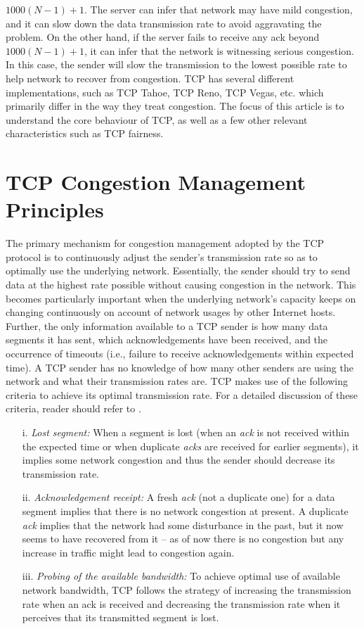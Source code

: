 \begin{multicols}{2}
$1000(N-1) + 1$. The server can infer that network may have mild congestion, and it can slow down the data transmission rate to avoid aggravating the problem. On the other hand, if the server fails to receive any ack beyond $1000(N-1) + 1$, it can infer that the network is witnessing serious congestion. In this case, the sender will slow the transmission to the lowest possible rate to help network to recover from congestion. TCP has several different implementations, such as TCP Tahoe, TCP Reno, TCP Vegas, etc. which primarily differ in the way they treat congestion. The focus of this article is to understand the core behaviour of TCP, as well as a few other relevant characteristics such as TCP fairness. 

\section*{TCP Congestion Management Principles}

The primary mechanism for congestion management adopted by the TCP protocol is to continuously adjust the sender’s transmission rate so as to optimally use the underlying network. Essentially, the sender should try to send data at the highest rate possible without causing congestion in the network. This becomes particularly important when the underlying network’s capacity keeps on changing continuously on account of network usages by other Internet hosts. Further, the only information available to a TCP sender is how many data segments it has sent, which acknowledgements have been received, and the occurrence of timeouts (i.e., failure to receive acknowledgements within expected time). A TCP sender has no knowledge of how many other senders are using the network and what their transmission rates are. TCP makes use of the following criteria to achieve its optimal transmission rate. For a detailed discussion of these criteria, reader should refer to  \cite{art2-key03}.
\begin{itemize}

\itemsep=.2cm

\item[i.] \textit{Lost segment:} When a segment is lost (when an \textit{ack} is not received within the expected time or when duplicate \textit{acks} are received for earlier segments), it implies some network congestion and thus the sender should decrease its transmission rate.
\item[ii.] \textit{Acknowledgement receipt:} A fresh \textit{ack} (not a duplicate one) for a data segment implies that there is no network congestion at present. A duplicate \textit{ack} implies that the network had some disturbance in the past, but it now seems to have recovered from it – as of now there is no congestion but any increase in traffic might lead to congestion again.
\item[iii.] \textit{Probing of the available bandwidth:} To achieve optimal use of available network bandwidth, TCP follows the strategy of increasing the transmission rate when an ack is received and decreasing the transmission rate when it perceives that its transmitted segment is lost.
\end{itemize}


\end{multicols}
